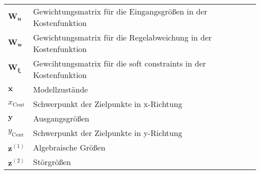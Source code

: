 \begin{longtable}{p{}p{}}
    $\boldsymbol{W_{u}}$             & Gewichtungsmatrix für die Eingangsgrößen in der Kostenfunktion   \\
    $\boldsymbol{W_{w}}$             & Gewichtungsmatrix für die Regelabweichung in der Kostenfunktion  \\
    $\boldsymbol{W_{\xi}}$           & Gewcihtungsmatrix für die soft constraints in der Kostenfunktion \\
    $\boldsymbol{x}$                 & Modellzustände                                                   \\
    $x_{\mathrm{Cent}}$              & Schwerpunkt der Zielpunkte in x-Richtung  \\
    $\boldsymbol{y}$                 & Ausgangsgrößen                                                   \\
    $y_{\mathrm{Cent}}$              & Schwerpunkt der Zielpunkte in y-Richtung  \\
    $\boldsymbol{z}^{(1)}$           & Algebraische Größen                                              \\
    $\boldsymbol{z}^{(2)}$           & Störgrößen                                                       \\
\end{longtable}

\clearpage
\newpage \vspace*{-1cm}

\renewcommand{\arraystretch}{1.5}
